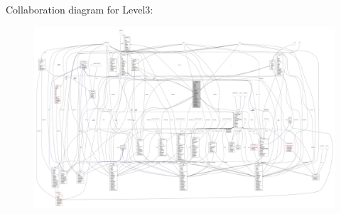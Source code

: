 Collaboration diagram for Level3\+:
\nopagebreak
\begin{figure}[H]
\begin{center}
\leavevmode
\includegraphics[width=350pt]{classscenes_1_1_level3__coll__graph}
\end{center}
\end{figure}
